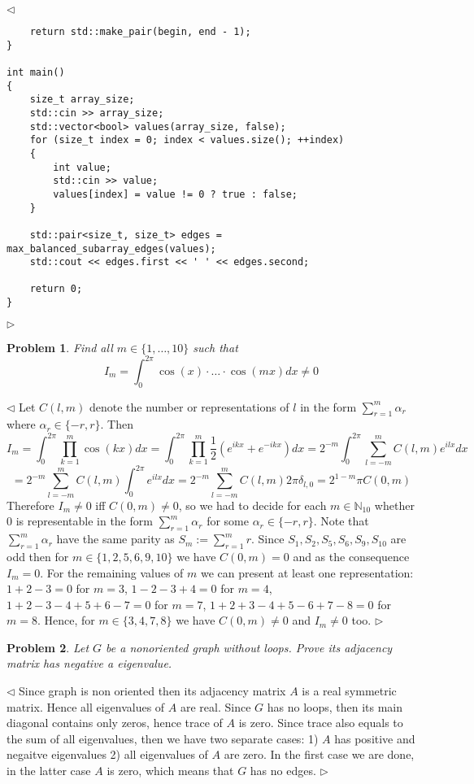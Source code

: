 \documentclass[12pt]{article}
\newtheorem{problem}{Problem}[subsection]
\newenvironment{solution}{\par $\triangleleft$}{$\triangleright$}
\begin{document}
\begin{solution}
\begin{verbatim}
    return std::make_pair(begin, end - 1);
}
 
int main()
{
    size_t array_size;
    std::cin >> array_size;
    std::vector<bool> values(array_size, false);
    for (size_t index = 0; index < values.size(); ++index)
    {
        int value;
        std::cin >> value;
        values[index] = value != 0 ? true : false;
    }
 
    std::pair<size_t, size_t> edges = max_balanced_subarray_edges(values);
    std::cout << edges.first << ' ' << edges.second;
    
    return 0;
}
\end{verbatim}
\end{solution}
 
\begin{problem} Find all $m\in\{1,\ldots,10\}$ such that
$$
I_m=\int_0^{2\pi} \cos(x)\cdot\ldots\cdot\cos(mx)dx\neq 0
$$
\end{problem}
\begin{solution} Let $C(l,m)$ denote the number or representations of $l$ in the form $\sum_{r=1}^m\alpha_r$ where $\alpha_r\in\{-r,r\}$. Then
$$
I_m=\int_0^{2\pi}\prod_{k=1}^m\cos(kx)dx
=\int_0^{2\pi}\prod_{k=1}^m\frac{1}{2}(e^{ikx}+e^{-ikx})dx
=2^{-m}\int_0^{2\pi}\sum_{l=-m}^m C(l,m) e^{ilx}dx
$$
$$
=2^{-m}\sum_{l=-m}^m C(l,m)\int_0^{2\pi} e^{ilx}dx
=2^{-m}\sum_{l=-m}^m C(l,m)2\pi \delta_{l,0}
=2^{1-m}\pi C(0,m)
$$
Therefore $I_m\neq 0$ iff $C(0,m)\neq 0$, so we had to decide for each $m\in\mathbb{N}_{10}$ whether $0$ is representable in the form $\sum_{r=1}^m\alpha_r$ for some $\alpha_r\in\{-r,r\}$. Note that $\sum_{r=1}^m\alpha_r$ have the same parity as $S_m:=\sum_{r=1}^m r$. Since $S_1, S_2, S_5, S_6, S_9, S_{10}$ are odd then for $m\in\{1,2,5,6,9,10\}$ we have $C(0,m)=0$ and as the consequence $I_m=0$. For the remaining values of $m$ we can present at least one representation: $1+2-3=0$ for $m=3$, $1-2-3+4=0$ for $m=4$, $1+2-3-4+5+6-7=0$ for $m=7$, $1+2+3-4+5-6+7-8=0$ for $m=8$. Hence, for $m\in\{3, 4, 7, 8\}$ we have $C(0,m)\neq 0$ and $I_m\neq 0$ too. 
\end{solution}
 
\begin{problem} Let $G$ be a nonoriented graph without loops. Prove its adjacency matrix has negative a eigenvalue. 
\end{problem}
\begin{solution} Since graph is non oriented then its adjacency matrix $A$ is a real symmetric matrix. Hence all eigenvalues of $A$ are real. Since $G$ has no loops, then its main diagonal contains only zeros, hence trace of $A$ is zero. Since trace also equals to the sum of all eigenvalues, then we have two separate cases: 1) $A$ has positive and negaitve eigenvalues 2) all eigenvalues of $A$ are zero. In the first case we are done, in the latter case $A$ is zero, which means that $G$ has no edges.
\end{solution}
 
\end{document}
